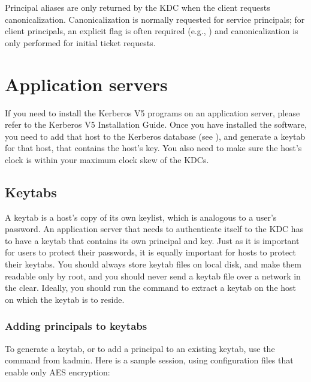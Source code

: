 \documentclass[letterpaper,10pt,english]{sphinxmanual}
\begin{document}
\sphinxAtStartPar
Principal aliases are only returned by the KDC when the client
requests canonicalization.  Canonicalization is normally requested for
service principals; for client principals, an explicit flag is often
required (e.g., ) and canonicalization is only performed
for initial ticket requests.

\sphinxstepscope


\chapter{Application servers}
\label{\detokenize{admin/appl_servers:application-servers}}\label{\detokenize{admin/appl_servers::doc}}
\sphinxAtStartPar
If you need to install the Kerberos V5 programs on an application
server, please refer to the Kerberos V5 Installation Guide.  Once you
have installed the software, you need to add that host to the Kerberos
database (see {\hyperref[\detokenize{admin/database:principals}]{}}), and generate a keytab for that host,
that contains the host’s key.  You also need to make sure the host’s
clock is within your maximum clock skew of the KDCs.


\section{Keytabs}
\label{\detokenize{admin/appl_servers:keytabs}}
\sphinxAtStartPar
A keytab is a host’s copy of its own keylist, which is analogous to a
user’s password.  An application server that needs to authenticate
itself to the KDC has to have a keytab that contains its own principal
and key.  Just as it is important for users to protect their
passwords, it is equally important for hosts to protect their keytabs.
You should always store keytab files on local disk, and make them
readable only by root, and you should never send a keytab file over a
network in the clear.  Ideally, you should run the {\hyperref[\detokenize{admin/admin_commands/kadmin_local:kadmin-1}]{}}
command to extract a keytab on the host on which the keytab is to
reside.


\subsection{Adding principals to keytabs}
\label{\detokenize{admin/appl_servers:adding-principals-to-keytabs}}\label{\detokenize{admin/appl_servers:add-princ-kt}}
\sphinxAtStartPar
To generate a keytab, or to add a principal to an existing keytab, use
the  command from kadmin.  Here is a sample session, using
configuration files that enable only AES encryption:
\end{document}
